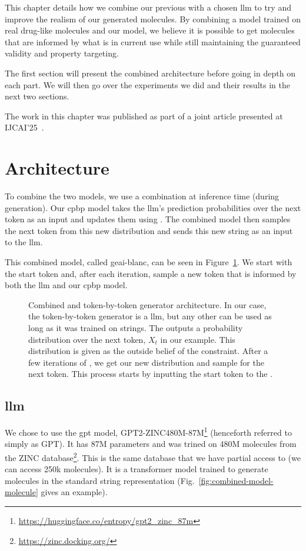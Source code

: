 \documentclass[../Document.tex]{subfiles}
\begin{document}
\label{chap:gpt+cp}
This chapter details how we combine our previous \cp with a chosen \gls{llm} to try and improve the realism of our generated molecules. By combining a model trained on real drug-like molecules and our \cp model, we believe it is possible to get molecules that are informed by what is in current use while still maintaining the guaranteed validity and property targeting.

The first section will present the combined architecture before going in depth on each part. We will then go over the experiments we did and their results in the next two sections.

The work in this chapter was published as part of a joint article presented at IJCAI'25~\cite{ijcai:saikali}.

\section{Architecture}
To combine the two models, we use a combination at inference time (\ie during generation). Our \gls{cpbp} model takes the \gls{llm}'s prediction probabilities over the next token as an input and updates them using \bp. The combined model then samples the next token from this new distribution and sends this new string as an input to the \gls{llm}.

This combined model, called \gls{geai-blanc}, can be seen in Figure~\ref{fig:combined-architecture}. We start with the start token and, after each iteration, sample a new token that is informed by both the \gls{llm} and our \gls{cpbp} model.

\begin{figure}
    \centering
    
    \caption[Combined \cp and token-by-token generator architecture.]{Combined \cp and token-by-token generator architecture. In our case, the token-by-token generator is a \gls{llm}, but any other can be used as long as it was trained on \smiles strings. The \nn outputs a probability distribution over the next token, $X_t$ in our example. This distribution is given as the outside belief of the \oracle constraint. After a few iterations of \bp, we get our new distribution and sample for the next token. This process starts by inputting the start token to the \nn.}
    \label{fig:combined-architecture}
\end{figure}

\subsection{\gls{llm}}
We chose to use the \gls{gpt} model, GPT2-ZINC480M-87M\footnote{\url{https://huggingface.co/entropy/gpt2_zinc_87m}} (henceforth referred to simply as GPT).
It has 87M parameters and was trined on 480M molecules from the ZINC database\footnote{\url{https://zinc.docking.org/}}.
This is the same database that we have partial access to (we can access 250k molecules).
It is a transformer model trained to generate molecules in the standard string representation \smiles (Fig.~\ref{fig:combined-model-molecule} gives an example).
\end{document}
